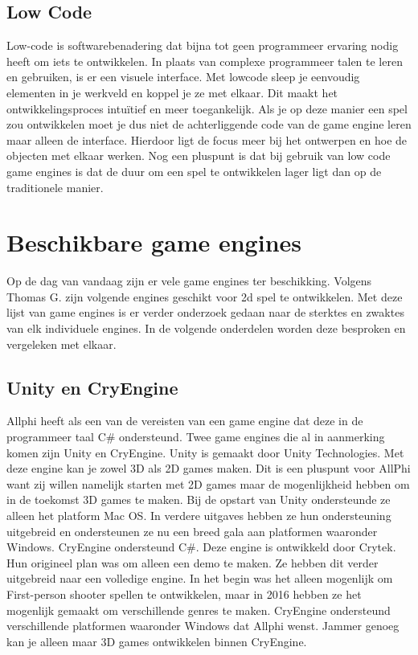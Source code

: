 \subsection{Low Code}
Low-code is softwarebenadering dat bijna tot geen programmeer ervaring nodig heeft om iets te ontwikkelen. In plaats van complexe programmeer talen te leren en gebruiken, is er een visuele interface.\autocite{Kissflow2024} Met lowcode sleep je eenvoudig elementen in je werkveld en koppel je ze met elkaar. Dit maakt het ontwikkelingsproces intuïtief en meer toegankelijk. Als je op deze manier een spel zou ontwikkelen moet je dus niet de achterliggende code van de game engine leren maar alleen de interface. Hierdoor ligt de focus meer bij het ontwerpen en hoe de objecten met elkaar werken. Nog een pluspunt is dat bij gebruik van low code game engines is dat de duur om een spel te ontwikkelen lager ligt dan op de traditionele manier. \autocite{Trigo2022}



\section{Beschikbare game engines}
Op de dag van vandaag zijn er vele game engines ter beschikking. Volgens Thomas G. \cite{Gervraud2020} zijn volgende engines geschikt voor 2d spel te ontwikkelen. Met deze lijst van game engines is er verder onderzoek gedaan naar de sterktes en zwaktes van elk individuele engines. In de volgende onderdelen worden deze besproken en vergeleken met elkaar.
\subsection{Unity en CryEngine}
Allphi heeft als een van de vereisten van een game engine dat deze in de programmeer taal C\# ondersteund. Twee game engines die al in aanmerking komen zijn Unity en CryEngine. Unity is gemaakt door Unity Technologies. Met deze engine kan je zowel 3D als 2D games maken. Dit is een pluspunt voor AllPhi want zij willen namelijk starten met 2D games maar de mogenlijkheid hebben om in de toekomst 3D games te maken. Bij de opstart van Unity ondersteunde ze alleen het platform Mac OS. In verdere uitgaves hebben ze hun ondersteuning uitgebreid en ondersteunen ze nu een breed gala aan platformen waaronder Windows. CryEngine ondersteund C\#. Deze engine is ontwikkeld door Crytek. Hun origineel plan was om alleen een demo te maken. Ze hebben dit verder uitgebreid naar een volledige engine. In het begin was het alleen mogenlijk om First-person shooter spellen te ontwikkelen, maar in 2016 hebben ze het mogenlijk gemaakt om verschillende genres te maken. CryEngine ondersteund verschillende platformen waaronder Windows dat Allphi wenst. Jammer genoeg kan je alleen maar 3D games ontwikkelen binnen CryEngine. \autocite{Barczak2021}

